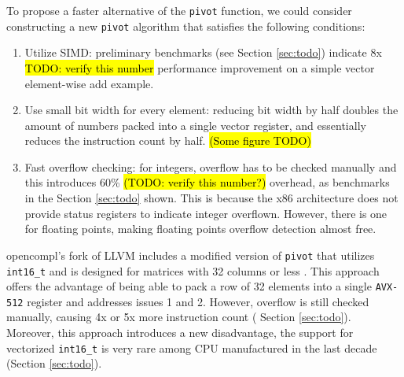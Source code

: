 \documentclass[logo,bsc,singlespacing,parskip]{infthesis}
\begin{document}
To propose a faster alternative of the \texttt{pivot} function, we could
consider constructing a new \texttt{pivot} algorithm that satisfies the
following conditions:
\begin{enumerate}

\item Utilize SIMD: preliminary benchmarks (see Section \ref{sec:todo}) indicate
8x \hl{TODO: verify this number} performance improvement on a simple vector
element-wise add example. 

\item Use small bit width for every element: reducing bit width by half doubles the
amount of numbers packed into a single vector register, and essentially reduces
the instruction count by half.  \hl{(Some figure TODO)}

\item Fast overflow checking: for integers, overflow has to be checked manually
and this introduces 60\%  \hl{(TODO: verify this number?)} overhead, as
benchmarks in the Section \ref{sec:todo} shown. This is because the x86
architecture does not provide status registers to indicate integer overflown.
However, there is one for floating points, making floating points overflow
detection almost free. 

\end{enumerate}


opencompl’s fork of LLVM includes a modified version of \texttt{pivot} that
utilizes \texttt{int16\_t} and is designed for matrices with 32 columns or less \cite{FPL2}.
This approach offers the advantage of being able to pack a row of 32 elements
into a single \texttt{AVX-512} register and addresses issues 1 and 2. However,
overflow is still checked manually, causing 4x or 5x more instruction count (
Section \ref{sec:todo}). Moreover, this approach introduces a new disadvantage,
the support for vectorized \texttt{int16\_t} is very rare among CPU manufactured
in the last decade (Section \ref{sec:todo}). 
\end{document}
